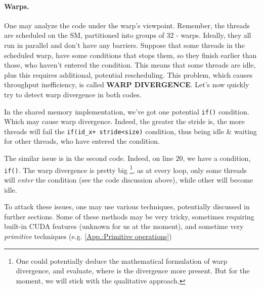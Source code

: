 \documentclass[12pt]{article}
\begin{document}
\paragraph*{Warps.} One may analyze the code under the warp's viewpoint. Remember, the threads are scheduled 
on the SM, partitioned into groups of 32 - warps. Ideally, they all run in parallel and don't have any 
barriers. Suppose that some threads in the scheduled warp, have some conditions that stops them, so they finish earlier than 
those, who haven't entered the condition. This means that some threads are idle, plus this requires additional, potential 
rescheduling. This problem, which causes throughput inefficiency, is called \textbf{WARP DIVERGENCE}. 
Let's now quickly try to detect warp divergence in both codes. 

In the shared memory implementation, we've got one potential
\verb|if()| condition. Which may cause warp divergence. Indeed, the greater the stride is, 
the more threads will fail the \verb|if(id_x+ stride<size)| condition, thus being idle \& waiting for other threads, who have entered the condition.


The similar issue is in the second code. Indeed, on line  $20$, we have a condition, \verb|if()|. 
The warp divergence is pretty big \footnote{One could potentially deduce the mathematical formulation of warp divergence, 
and evaluate, where is the divergence more present. But for the moment, we will stick with the qualitative approach.}, as 
at every loop, only some threads will \textit{enter} the condition (see the code discussion above), while other will become 
idle. 

To attack these issues, one may use various techniques, potentially discussed in further sections. 
Some of these methods may be very tricky, sometimes requiring built-in CUDA features (unknown for us at the moment), and 
sometime very \textit{primitive} techniques (e.g. \autoref{App.:Primitive operations})
\end{document}
